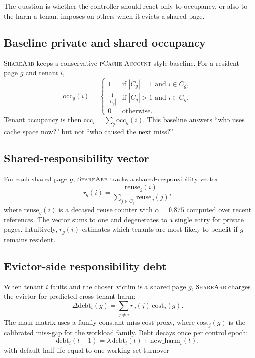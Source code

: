 \documentclass{article}
\newcommand{\sharearb}{\textsc{ShareArb}\xspace}
\newcommand{\pcache}{\textsc{pCache-Account}\xspace}
\begin{document}
The question is whether the controller should react only to occupancy, or also to the harm a tenant imposes on others when it evicts a shared page.

\subsection{Baseline private and shared occupancy}

\sharearb keeps a conservative \pcache-style baseline. For a resident page $g$ and tenant $i$,
\[
\mathrm{occ}_g(i) =
\begin{cases}
1 & \text{if } |C_g|=1 \text{ and } i \in C_g, \\
\frac{1}{|C_g|} & \text{if } |C_g|>1 \text{ and } i \in C_g, \\
0 & \text{otherwise.}
\end{cases}
\]
Tenant occupancy is then $\mathrm{occ}_i = \sum_g \mathrm{occ}_g(i)$. This baseline answers ``who uses cache space now?'' but not ``who caused the next miss?''

\subsection{Shared-responsibility vector}

For each shared page $g$, \sharearb tracks a shared-responsibility vector
\[
r_g(i) = \frac{\mathrm{reuse}_g(i)}{\sum_{j \in C_g} \mathrm{reuse}_g(j)},
\]
where $\mathrm{reuse}_g(i)$ is a decayed reuse counter with $\alpha=0.875$ computed over recent references. The vector sums to one and degenerates to a single entry for private pages. Intuitively, $r_g(i)$ estimates which tenants are most likely to benefit if $g$ remains resident.

\subsection{Evictor-side responsibility debt}

When tenant $i$ faults and the chosen victim is a shared page $g$, \sharearb charges the evictor for predicted cross-tenant harm:
\[
\Delta \mathrm{debt}_i(g) = \sum_{j \neq i} r_g(j)\,\mathrm{cost}_j(g).
\]
The main matrix uses a family-constant miss-cost proxy, where $\mathrm{cost}_j(g)$ is the calibrated miss-gap for the workload family. Debt decays once per control epoch:
\[
\mathrm{debt}_i(t+1) = \lambda\,\mathrm{debt}_i(t) + \mathrm{new\_harm}_i(t),
\]
with default half-life equal to one working-set turnover.
\end{document}
